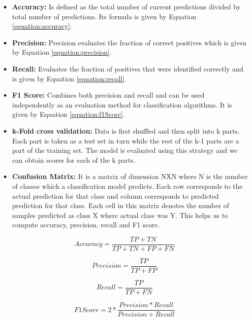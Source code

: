 \begin{itemize}
    \item \textbf{Accuracy:} Is defined as the total number of current predictions divided by total number of predictions. Its formula is given by Equation \ref{equation:accuracy}.
    \item \textbf{Precision:} Precision evaluates the fraction of correct positives which is given by Equation \ref{equation:precision}. 
    \item \textbf{Recall:} Evaluates the fraction of positives that were identified correctly and is given by Equation \ref{equation:recall}.
    \item \textbf{F1 Score:} Combines both precision and recall and can be used independently as an evaluation method for classification algorithms. It is given by Equation \ref{equation:f1Score}.
    \item \textbf{k-Fold cross validation:} Data is first shuffled and then split into k parts. Each part is taken as a test set in turn while the rest of the k-1 parts are a part of the training set. The model is evaluated using this strategy and we can obtain scores for each of the k parts.
    \item \textbf{Confusion Matrix:} It is a matrix of dimension NXN where N is the number of classes which a classification model predicts. Each row corresponds to the actual prediction for that class and column corresponds to predicted prediction for that class. Each cell in this matrix denotes the number of samples predicted as class X where actual class was Y. This helps us to compute accuracy, precision, recall and F1 score.
\end{itemize}

\begin{equation}
\label{equation:accuracy}
    Accuracy = \frac{TP + TN}{TP + TN + FP + FN}
\end{equation}

\begin{equation}
\label{equation:precision}
    Precision = \frac{TP}{TP + FP}
\end{equation}

\begin{equation}
\label{equation:recall}
    Recall = \frac{TP}{TP + FN}
\end{equation}

\begin{equation}
\label{equation:f1Score}
    F1 Score = 2*\frac{Precision*Recall}{Precision+Recall}
\end{equation}

